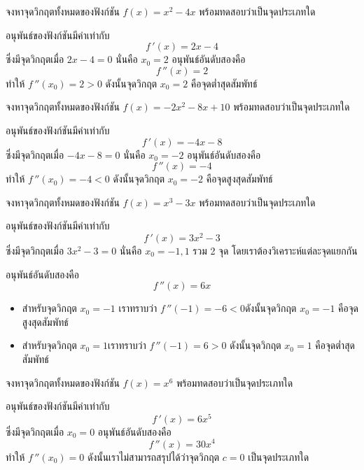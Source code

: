 \begin{frame}[t]
\begin{ex}
จงหาจุดวิกฤตทั้งหมดของฟังก์ชัน $f(x) = x^2-4x$ พร้อมทดสอบว่าเป็นจุดประเภทใด 
\end{ex}\pa 
\begin{sol}
อนุพันธ์ของฟังก์ชันมีค่าเท่ากับ 
\[f\,'(x) = 2x-4\] \pa 
ซึ่งมีจุดวิกฤตเมื่อ $2x-4 = 0$ นั่นคือ $x_0 = 2$ \pa อนุพันธ์อันดับสองคือ 
\[f\,''(x) = 2\] \pa 
ทำให้ $f\,''(x_0) = 2 > 0$ \pa ดังนั้นจุดวิกฤต $x_0 = 2$ คือจุดต่ำสุดสัมพัทธ์
\end{sol}
\end{frame}


\begin{frame}[t]
\begin{ex}
จงหาจุดวิกฤตทั้งหมดของฟังก์ชัน $f(x) = -2x^2-8x+10$ พร้อมทดสอบว่าเป็นจุดประเภทใด 
\end{ex}\pa 
\begin{sol}
อนุพันธ์ของฟังก์ชันมีค่าเท่ากับ 
\[f\,'(x) = -4x-8\] \pa 
ซึ่งมีจุดวิกฤตเมื่อ $-4x-8 = 0$ นั่นคือ $x_0 = -2$ \pa อนุพันธ์อันดับสองคือ 
\[f\,''(x) = -4\] \pa 
ทำให้ $f\,''(x_0) = -4 < 0$ \pa ดังนั้นจุดวิกฤต $x_0 = -2$ คือจุดสูงสุดสัมพัทธ์
\end{sol}
\end{frame}


\begin{frame}[t]
\begin{ex}
จงหาจุดวิกฤตทั้งหมดของฟังก์ชัน $f(x) = x^3-3x$ พร้อมทดสอบว่าเป็นจุดประเภทใด 
\end{ex} 
\begin{sol}
อนุพันธ์ของฟังก์ชันมีค่าเท่ากับ 
\[f\,'(x) = 3x^2-3\] \pa 
ซึ่งมีจุดวิกฤตเมื่อ $3x^2-3 = 0$ นั่นคือ $x_0 = -1, 1$ \pa รวม 2 จุด โดยเราต้องวิเคราะห์แต่ละจุดแยกกัน

อนุพันธ์อันดับสองคือ 
\[f\,''(x) = 6x\] \pa
\begin{itemize}
\item สำหรับจุดวิกฤต $x_0 = -1$ \pa เราทราบว่า $f\,''(-1) = -6 < 0$\pa  ดังนั้นจุดวิกฤต $x_0 = -1$ คือจุดสูงสุดสัมพัทธ์\pa 
\item สำหรับจุดวิกฤต $x_0 = 1$\pa  เราทราบว่า $f\,''(-1) = 6 > 0$ \pa ดังนั้นจุดวิกฤต $x_0 = 1$ คือจุดต่ำสุดสัมพัทธ์
\end{itemize}
\end{sol}
\end{frame}


\begin{frame}[t]
\begin{ex}
จงหาจุดวิกฤตทั้งหมดของฟังก์ชัน $f(x) = x^6$ พร้อมทดสอบว่าเป็นจุดประเภทใด 
\end{ex} 
\begin{sol}
อนุพันธ์ของฟังก์ชันมีค่าเท่ากับ 
\[f\,'(x) = 6x^5\] \pa 
ซึ่งมีจุดวิกฤตเมื่อ $x_0 = 0$ \pa อนุพันธ์อันดับสองคือ 
\[f\,''(x) = 30x^4\] \pa 
ทำให้ $f\,''(x_0) = 0$ \pa ดังนั้นเราไม่สามารถสรุปได้ว่าจุดวิกฤต $c = 0$ เป็นจุดประเภทใด
\end{sol}
\end{frame}

